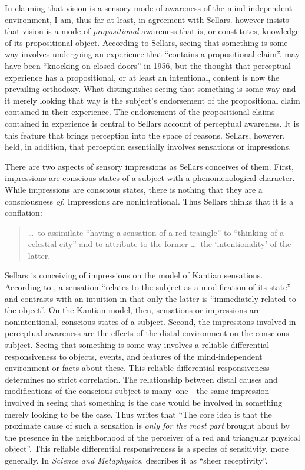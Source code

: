 \documentclass[12pt]{article}
\begin{document}
In claiming that vision is a sensory mode of awareness of the mind-independent environment, I am, thus far at least, in agreement with Sellars. \citet{Sellars:1956xp} however insists that vision is a mode of \emph{propositional} awareness that is, or constitutes, knowledge of its propositional object. According to Sellars, seeing that something is some way involves undergoing an experience that ``contains a propositional claim''. \citet[§15]{Sellars:1956xp} may have been ``knocking on closed doors'' in 1956, but the thought that perceptual experience has a propositional, or at least an intentional, content is now the prevailing orthodoxy. What distinguishes seeing that something is some way and it merely looking that way is the subject's endorsement of the propositional claim contained in their experience. The endorsement of the propositional claims contained in experience is central to Sellars account of perceptual awareness. It is this feature that brings perception into the space of reasons. Sellars, however, held, in addition, that perception essentially involves sensations or impressions.

There are two aspects of sensory impressions as Sellars conceives of them. First, impressions are conscious states of a subject with a phenomenological character. While impressions are conscious states, there is nothing that they are a consciousness \emph{of}. Impressions are nonintentional. Thus Sellars thinks that it is a conflation:
\begin{quote}
    \ldots\ to assimilate ``having a sensation of a red traingle'' to ``thinking of a celestial city'' and to attribute to the former \ldots\ the `intentionality' of the latter. \citep[§7]{Sellars:1956xp}
\end{quote}
Sellars is conceiving of impressions on the model of Kantian sensations. According to \citet[B376--7]{Kant:1781fk}, a sensation ``relates to the subject as a modification of its state'' and contrasts with  an intuition in that only the latter is ``immediately related to the object''. On the Kantian model, then, sensations or impressions are nonintentional, conscious states of a subject. Second, the impressions involved in perceptual awareness are the effects of the distal environment on the conscious subject. Seeing that something is some way involves a reliable differential responsiveness to objects, events, and features of the mind-independent environment or facts about these. This reliable differential responsiveness determines no strict correlation. The relationship between distal causes and modifications of the conscious subject is many--one---the same impression involved in seeing that something is the case would be involved in something merely looking to be the case. Thus \citet[§7]{Sellars:1956xp} writes that ``The core idea is that the proximate cause of such a sensation is \emph{only for the most part} brought about by the presence in the neighborhood of the perceiver of a red and triangular physical object''. This reliable differential responsiveness is a species of sensitivity, more generally. In \emph{Science and Metaphysics}, \citet[4]{Sellars:1967uq} describes it as ``sheer receptivity''.
\end{document}
